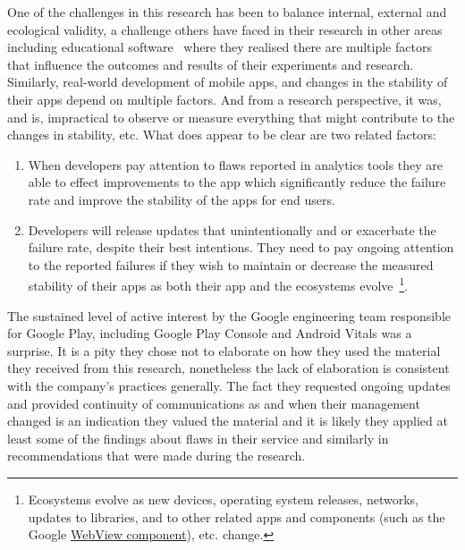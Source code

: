 One of the challenges in this research has been to balance internal, external and ecological validity, a challenge others have faced in their research in other areas including educational software~ where they realised there are multiple factors that influence the outcomes and results of their experiments and research. Similarly, real-world development of mobile apps, and changes in the stability of their apps depend on multiple factors. And from a research perspective, it was, and is, impractical to observe or measure everything that might contribute to the changes in stability, etc. What does appear to be clear are two related factors:

\begin{enumerate}
    \item When developers pay attention to flaws reported in analytics tools they are able to effect improvements to the app which significantly reduce the failure rate and improve the stability of the apps for end users.
    \item Developers will release updates that unintentionally and or exacerbate the failure rate, despite their best intentions. They need to pay ongoing attention to the reported failures if they wish to maintain or decrease the measured stability of their apps as both their app and the ecosystems evolve~\footnote{Ecosystems evolve as new devices, operating system releases, networks, updates to libraries, and to other related apps and components (such as the Google \href{ection-webview-component}{WebView component}), etc. change.}.
\end{enumerate}

The sustained level of active interest by the Google engineering team responsible for Google Play, including Google Play Console and Android Vitals was a surprise. It is a pity they chose not to elaborate on how they used the material they received from this research, nonetheless the lack of elaboration is consistent with the company's practices generally. The fact they requested ongoing updates and provided continuity of communications as and when their management changed is an indication they valued the material and it is likely they applied at least some of the findings about flaws in their service and similarly in recommendations that were made during the research.


